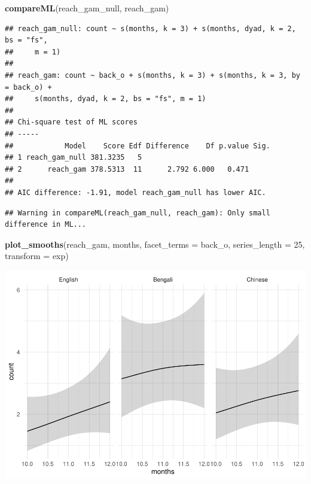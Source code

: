 \documentclass[]{article}
\newenvironment{Shaded}{\begin{snugshade}}{\end{snugshade}}
\newcommand{\DataTypeTok}[1]{\textcolor[rgb]{0.13,0.29,0.53}{#1}}
\newcommand{\DecValTok}[1]{\textcolor[rgb]{0.00,0.00,0.81}{#1}}
\newcommand{\KeywordTok}[1]{\textcolor[rgb]{0.13,0.29,0.53}{\textbf{#1}}}
\newcommand{\NormalTok}[1]{#1}
\begin{document}
\begin{Shaded}
\begin{Highlighting}[]
\KeywordTok{compareML}\NormalTok{(reach_gam_null, reach_gam)}
\end{Highlighting}
\end{Shaded}

\begin{verbatim}
## reach_gam_null: count ~ s(months, k = 3) + s(months, dyad, k = 2, bs = "fs", 
##     m = 1)
## 
## reach_gam: count ~ back_o + s(months, k = 3) + s(months, k = 3, by = back_o) + 
##     s(months, dyad, k = 2, bs = "fs", m = 1)
## 
## Chi-square test of ML scores
## -----
##            Model    Score Edf Difference    Df p.value Sig.
## 1 reach_gam_null 381.3235   5                              
## 2      reach_gam 378.5313  11      2.792 6.000   0.471     
## 
## AIC difference: -1.91, model reach_gam_null has lower AIC.
\end{verbatim}

\begin{verbatim}
## Warning in compareML(reach_gam_null, reach_gam): Only small difference in ML...
\end{verbatim}

\begin{Shaded}
\begin{Highlighting}[]
\KeywordTok{plot_smooths}\NormalTok{(reach_gam, months, }\DataTypeTok{facet_terms =}\NormalTok{ back_o, }\DataTypeTok{series_length =} \DecValTok{25}\NormalTok{, }\DataTypeTok{transform =}\NormalTok{ exp)}
\end{Highlighting}
\end{Shaded}

\includegraphics{supplement_files/figure-latex/reach-gam-plot-1.pdf}
\end{document}
